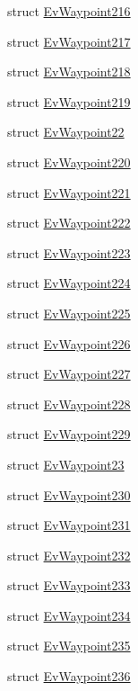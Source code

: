 \begin{DoxyCompactItemize}
\item 
struct \hyperlink{structsmacc_1_1EvWaypoint216}{Ev\+Waypoint216}
\item 
struct \hyperlink{structsmacc_1_1EvWaypoint217}{Ev\+Waypoint217}
\item 
struct \hyperlink{structsmacc_1_1EvWaypoint218}{Ev\+Waypoint218}
\item 
struct \hyperlink{structsmacc_1_1EvWaypoint219}{Ev\+Waypoint219}
\item 
struct \hyperlink{structsmacc_1_1EvWaypoint22}{Ev\+Waypoint22}
\item 
struct \hyperlink{structsmacc_1_1EvWaypoint220}{Ev\+Waypoint220}
\item 
struct \hyperlink{structsmacc_1_1EvWaypoint221}{Ev\+Waypoint221}
\item 
struct \hyperlink{structsmacc_1_1EvWaypoint222}{Ev\+Waypoint222}
\item 
struct \hyperlink{structsmacc_1_1EvWaypoint223}{Ev\+Waypoint223}
\item 
struct \hyperlink{structsmacc_1_1EvWaypoint224}{Ev\+Waypoint224}
\item 
struct \hyperlink{structsmacc_1_1EvWaypoint225}{Ev\+Waypoint225}
\item 
struct \hyperlink{structsmacc_1_1EvWaypoint226}{Ev\+Waypoint226}
\item 
struct \hyperlink{structsmacc_1_1EvWaypoint227}{Ev\+Waypoint227}
\item 
struct \hyperlink{structsmacc_1_1EvWaypoint228}{Ev\+Waypoint228}
\item 
struct \hyperlink{structsmacc_1_1EvWaypoint229}{Ev\+Waypoint229}
\item 
struct \hyperlink{structsmacc_1_1EvWaypoint23}{Ev\+Waypoint23}
\item 
struct \hyperlink{structsmacc_1_1EvWaypoint230}{Ev\+Waypoint230}
\item 
struct \hyperlink{structsmacc_1_1EvWaypoint231}{Ev\+Waypoint231}
\item 
struct \hyperlink{structsmacc_1_1EvWaypoint232}{Ev\+Waypoint232}
\item 
struct \hyperlink{structsmacc_1_1EvWaypoint233}{Ev\+Waypoint233}
\item 
struct \hyperlink{structsmacc_1_1EvWaypoint234}{Ev\+Waypoint234}
\item 
struct \hyperlink{structsmacc_1_1EvWaypoint235}{Ev\+Waypoint235}
\item 
struct \hyperlink{structsmacc_1_1EvWaypoint236}{Ev\+Waypoint236}
\item 

\end{DoxyCompactItemize}
